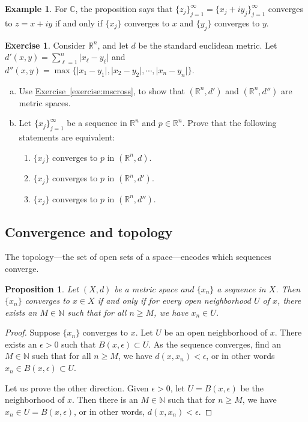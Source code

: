 \documentclass[12pt,openany]{book}
\newcommand{\sabs}[1]{\lvert {#1} \rvert}
\newcommand{\C}{{\mathbb{C}}}
\newcommand{\R}{{\mathbb{R}}}
\newcommand{\N}{{\mathbb{N}}}
\theoremstyle{plain}
\newtheorem{prop}[thm]{Proposition}
\theoremstyle{remark}
\theoremstyle{definition}
\newenvironment{exbox}{%
    \def\FrameCommand{\vrule width 1pt \relax\hspace{10pt}}%
    \MakeFramed{\advance\hsize-\width\FrameRestore}%
}{%
    \endMakeFramed
}
\newenvironment{exparts}{%
    \leavevmode\begin{enumerate}[a),noitemsep,topsep=0pt,parsep=0pt,partopsep=0pt]
}{%
    \end{enumerate}
}
\newenvironment{exnumparts}{%
    \leavevmode\begin{enumerate}[1),noitemsep,topsep=0pt,parsep=0pt,partopsep=0pt]
}{%
    \end{enumerate}
}
\theoremstyle{exercise}
\newtheorem{exercise}{Exercise}[section]
\theoremstyle{example}
\newtheorem{example}[thm]{Example}
\newcommand{\exerciseref}[1]{\hyperref[#1]{Exercise~\ref*{#1}}}
\begin{document}
\begin{example}
For $\C$, the proposition says that
$\{ z_j \}_{j=1}^\infty = \{ x_j + iy_j \}_{j=1}^\infty$ converges
to $z = x+iy$
if and only if $\{ x_j \}$ converges to $x$ and 
$\{ y_j \}$ converges to $y$.
\end{example}

\begin{exbox}
\begin{exercise}
Consider $\R^n$, and let $d$ be the standard euclidean metric.
Let $d'(x,y) = \sum_{\ell=1}^n \sabs{x_\ell-y_\ell}$
and $d''(x,y) = \max \bigl\{ \sabs{x_1-y_1},\sabs{x_2-y_2},\cdots,\sabs{x_n-y_n}
\bigr\}$.
\begin{exparts}
\item
Use \exerciseref{exercise:mscross}, to show that
$(\R^n,d')$ and
$(\R^n,d'')$ are metric spaces.
\item
Let $\{ x_j \}_{j=1}^\infty$ be a sequence in $\R^n$ and $p \in \R^n$.
Prove that the following statements are equivalent:
\begin{exnumparts}
\item
$\{ x_j \}$ converges to $p$ in $(\R^n,d)$.
\item
$\{ x_j \}$ converges to $p$ in $(\R^n,d')$.
\item
$\{ x_j \}$ converges to $p$ in $(\R^n,d'')$.
\end{exnumparts}
\end{exparts}
\end{exercise}
\end{exbox}

\subsection{Convergence and topology}

The topology---the set of open sets of a space---encodes which
sequences converge.

\begin{prop} \label{prop:msconvtopo}
Let $(X,d)$ be a metric space and $\{x_n\}$ a sequence in $X$.  Then
$\{ x_n \}$ converges to $x \in X$ if and only if for every open neighborhood
$U$ of $x$, there exists an $M \in \N$ such that for all $n \geq M$,
we have $x_n \in U$.
\end{prop}

\begin{proof}
Suppose $\{ x_n \}$ converges to $x$.  Let $U$ be an open neighborhood
of $x$.  There exists an $\epsilon > 0$ such that $B(x,\epsilon) \subset
U$.  As the sequence converges, find an $M \in \N$ such that for all $n \geq
M$, we have $d(x,x_n) < \epsilon$, or in other words $x_n \in B(x,\epsilon)
\subset U$.

Let us prove the other direction.  Given $\epsilon > 0$, let $U =
B(x,\epsilon)$ be the neighborhood of $x$.  Then there is an $M \in \N$
such that for $n \geq M$, we have $x_n \in U = B(x,\epsilon)$, or in other
words, $d(x,x_n) < \epsilon$.
\end{proof}
\end{document}
